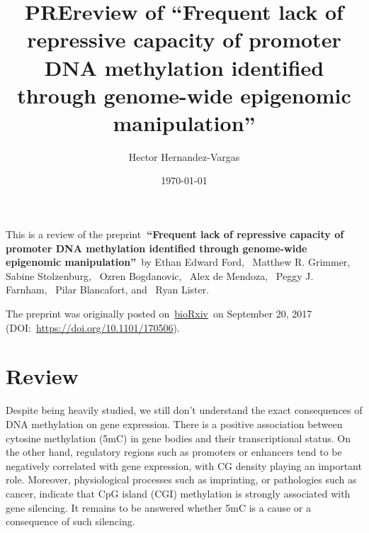 \documentclass[10pt]{article}
\renewenvironment{abstract}
  {{\bfseries\noindent{\abstractname}\par\nobreak}\footnotesize}
  {\bigskip}
\begin{document}
\title{PREreview of ``Frequent lack of repressive capacity of promoter DNA
methylation identified through genome-wide epigenomic manipulation''}



\author[1]{Hector Hernandez-Vargas}%
%


\vspace{-1em}



  \date{\today}


\begingroup
\let\center\flushleft
\let\endcenter\endflushleft
\maketitle
\endgroup





\begin{abstract}
This is a review of the preprint\textbf{~``Frequent lack of repressive
capacity of promoter DNA methylation identified through genome-wide
epigenomic manipulation''}~by Ethan Edward Ford,~ Matthew R. Grimmer,~
Sabine Stolzenburg,~ Ozren Bogdanovic,~ Alex de Mendoza,~ Peggy J.
Farnham,~ Pilar Blancafort, and~ Ryan Lister.

The preprint was originally posted
on~\href{https://www.biorxiv.org/}{bioRxiv}~on September 20, 2017
(DOI:~\url{https://doi.org/10.1101/170506}).~%
\end{abstract}%






\section*{Review}

{\label{874460}}\par\null

Despite being heavily studied, we still don't understand the exact
consequences of DNA methylation on gene expression. There is a positive
association between cytosine methylation (5mC) in gene bodies and their
transcriptional status. On the other hand, regulatory regions such as
promoters or enhancers tend to be negatively correlated with gene
expression, with CG density playing an important role. Moreover,
physiological processes such as imprinting, or pathologies such as
cancer, indicate that CpG island (CGI) methylation is strongly
associated with gene silencing. It remains to be answered whether 5mC is
a cause or a consequence of such silencing.
\end{document}
